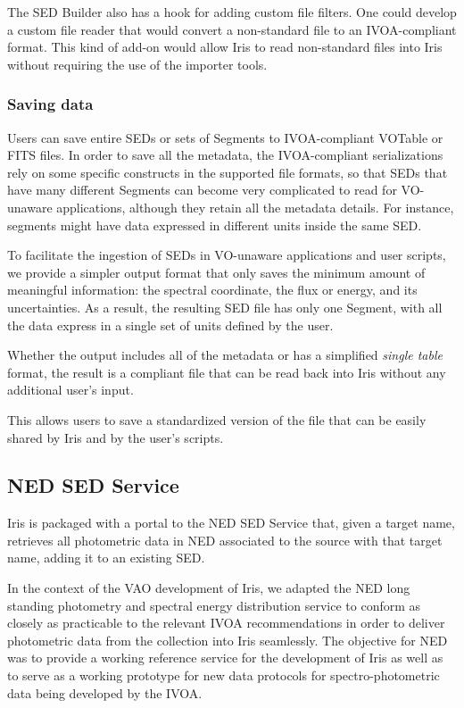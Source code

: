 \documentclass[final,5p,authoryear]{elsarticle}
\begin{document}
The SED Builder also has a hook for adding custom file filters. One could develop
a custom file reader that would convert a non-standard file to an IVOA-compliant
format. This kind of add-on would allow Iris to read non-standard
files into Iris without requiring the use of the importer tools.

\subsubsection{Saving data} Users can save entire SEDs or sets of Segments to
IVOA-compliant VOTable or FITS files. In order to save all the metadata, the
IVOA-compliant serializations rely on some specific constructs in the supported
file formats, so that SEDs that have many different Segments can become very
complicated to read for VO-unaware applications, although they retain all the
metadata details. For instance, segments might have data expressed in different
units inside the same SED.

To facilitate the ingestion of SEDs in VO-unaware applications and user scripts,
we provide a simpler output format that only saves the minimum amount of
meaningful information: the spectral coordinate, the flux or energy, and its
uncertainties. As a result, the resulting SED file has only
one Segment, with all the data express in a single set of units defined by the user.

Whether the output includes all of the metadata or has a simplified \emph{single
table} format, the result is a compliant file that can be read back into Iris
without any additional user's input.

This allows users to save a standardized version of the file that can be easily
shared by Iris and by the user's scripts.

\subsection{NED SED Service} \label{subsec:ned}

Iris is packaged with a portal to the NED SED
Service that, given a target name,
retrieves all photometric data in NED associated to the source with that target
name, adding it to an existing SED.

In the context of the VAO development of Iris, we adapted the NED long standing photometry and spectral energy
distribution service to conform as closely as practicable to the relevant
IVOA recommendations in order to deliver photometric data from the
collection into Iris seamlessly. The objective for NED was to provide a working reference
service for the development of Iris as well as to serve as a working prototype
for new data protocols for spectro-photometric data being developed by the IVOA.
\end{document}
